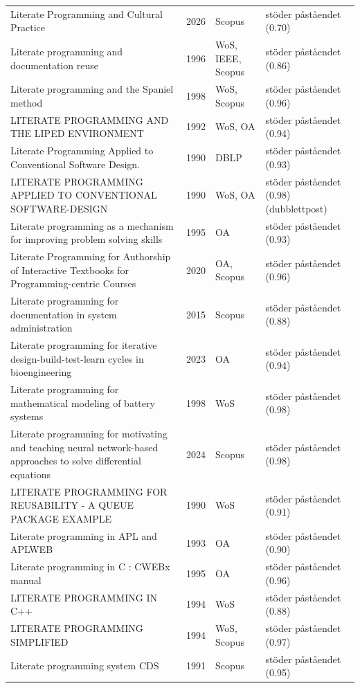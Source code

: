 \begin{longtable}{@{}%
  >{\raggedright\arraybackslash}p{}c%
  >{\raggedright\arraybackslash}p{}%
  >{\raggedright\arraybackslash}p{}@{}}
Literate Programming and Cultural Practice & 2026 & Scopus & stöder påståendet (0.70) \\
Literate programming and documentation reuse & 1996 & WoS, IEEE, Scopus & stöder påståendet (0.86) \\
Literate programming and the \textquotedbl{}Spaniel\textquotedbl{} method & 1998 & WoS, Scopus & stöder påståendet (0.96) \\
LITERATE PROGRAMMING AND THE LIPED ENVIRONMENT & 1992 & WoS, OA & stöder påståendet (0.94) \\
Literate Programming Applied to Conventional Software Design. & 1990 & DBLP & stöder påståendet (0.93) \\
LITERATE PROGRAMMING APPLIED TO CONVENTIONAL SOFTWARE-DESIGN & 1990 & WoS, OA & stöder påståendet (0.98) (dubblettpost) \\
Literate programming as a mechanism for improving problem solving skills & 1995 & OA & stöder påståendet (0.93) \\
Literate Programming for Authorship of Interactive Textbooks for Programming-centric Courses & 2020 & OA, Scopus & stöder påståendet (0.96) \\
Literate programming for documentation in system administration & 2015 & Scopus & stöder påståendet (0.88) \\
Literate programming for iterative design-build-test-learn cycles in bioengineering & 2023 & OA & stöder påståendet (0.94) \\
Literate programming for mathematical modeling of battery systems & 1998 & WoS & stöder påståendet (0.98) \\
Literate programming for motivating and teaching neural network-based approaches to solve differential equations & 2024 & Scopus & stöder påståendet (0.98) \\
LITERATE PROGRAMMING FOR REUSABILITY - A QUEUE PACKAGE EXAMPLE & 1990 & WoS & stöder påståendet (0.91) \\
Literate programming in APL and APLWEB & 1993 & OA & stöder påståendet (0.90) \\
Literate programming in C : CWEBx manual & 1995 & OA & stöder påståendet (0.96) \\
LITERATE PROGRAMMING IN C++ & 1994 & WoS & stöder påståendet (0.88) \\
LITERATE PROGRAMMING SIMPLIFIED & 1994 & WoS, Scopus & stöder påståendet (0.97) \\
Literate programming system CDS & 1991 & Scopus & stöder påståendet (0.95) \\

\end{longtable}

